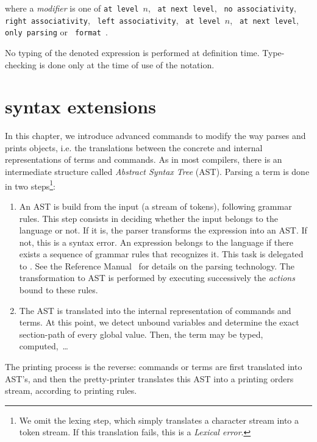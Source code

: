where a {\em modifier} is one of \texttt{at level $n$},
\texttt{ at next level},
\texttt{ no associativity}, \texttt{ right
associativity}, \texttt{ left associativity}, 
\texttt{ \nelist{\ident}{,} at level $n$},
\texttt{ \nelist{\ident}{,} at next level}, \texttt{ only parsing} or
\texttt{ format {\str}}.

\Rem No typing of the denoted expression is performed at definition
time. Type-checking is done only at the time of use of the notation.

%

\iffalse
\chapter{syntax extensions}
\label{Addoc-syntax}

In this chapter, we introduce advanced commands to modify the way
{\Coq} parses and prints objects, i.e. the translations between the
concrete and internal representations of terms and commands. As in
most compilers, there is an intermediate structure called {\em Abstract
Syntax Tree} (AST). Parsing a term is done in two steps\footnote{
  We omit the lexing step, which simply translates a character stream
  into a token stream. If this translation fails, this is a
  \emph{Lexical error}.
}:
\begin{enumerate}
\item An AST is build from the input (a stream of tokens), following
  grammar rules. This step consists in deciding whether the input
  belongs to the language or not. If it is, the parser transforms the
  expression into an AST. If not, this is a syntax error. An expression
  belongs to the language if there exists a sequence of grammar rules
  that recognizes it. This task is delegated to {\camlpppp}. See the
  Reference Manual~\cite{ddr98} for details on the parsing
  technology. The transformation to AST is performed by executing
  successively the {\sl actions} bound to these rules.
  
\item The AST is translated into the internal representation of
  commands and terms. At this point, we detect unbound variables and
  determine the exact section-path of every global value. Then, the term
  may be typed, computed,~\ldots
\end{enumerate}
The printing process is the reverse: commands or terms are first
translated into AST's, and then the pretty-printer translates this AST
into a printing orders stream, according to printing rules.

